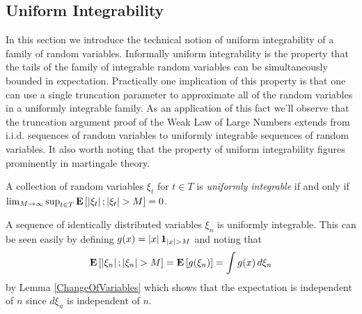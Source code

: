 \subsection{Uniform Integrability}

In this section we introduce the technical notion of uniform
integrability of a family of random variables.  Informally uniform
integrability is the property that the tails of the family of
integrable random
variables can be simultaneously bounded in expectation.  Practically
one implication of this property is that one can use a single
truncation parameter to approximate all of the random variables in a
uniformly integrable family.  As an application of this fact we'll
observe that the truncation argument proof of the Weak Law of Large
Numbers extends from i.i.d. sequences of random variables to uniformly
integrable sequences of random variables.  It also worth noting that
the property of uniform integrability figures prominently in
martingale theory.

\begin{defn}A collection of random variables $\xi_t$ for $t \in T$ is
  \emph{uniformly integrable} if and only if $\lim_{M \to \infty}
  \sup_{t \in T} \textbf{E}\left[\left \vert \xi_t \right \vert ; \left \vert \xi_t \right \vert > M\right] = 0$.
\end{defn}

\begin{examp}A sequence of identically distributed variables $\xi_n$ is
  uniformly integrable.  This can be seen easily by defining $g(x) =
  \left \vert x \right \vert\textbf{1}_{\left \vert x \right \vert>M}$ and noting that 
\begin{align*}
\textbf{E}\left[\left \vert \xi_n \right \vert ; \left \vert \xi_n \right \vert > M\right] = \textbf{E}\left[g(\xi_n)\right] =
\int g(x) \, d\xi_n
\end{align*}
by Lemma \ref{ChangeOfVariables} which shows that the expectation is
independent of $n$ since $d\xi_n$ is independent of $n$.
\end{examp}

